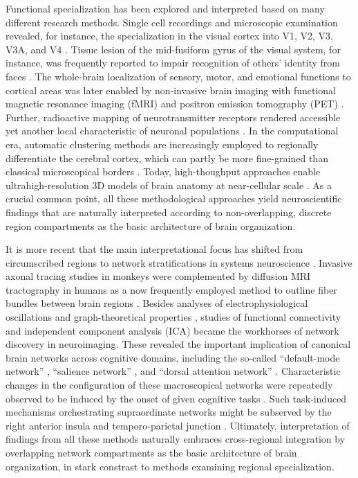 \documentclass{article} %
\begin{document}
Functional specialization has been
explored and interpreted based on many different research methods.
%
Single cell recordings and microscopic examination
revealed, for instance, the
specialization in the visual cortex into V1, V2, V3, V3A, and V4
\cite{hubel1962receptive, zeki1978functional}.
Tissue lesion of the mid-fusiform gyrus of the visual system,
for instance,
was frequently reported to impair
recognition of others' identity from faces
\cite{iaria2008contrib}.
The whole-brain localization of
sensory, motor, and emotional functions to cortical areas
was later enabled by
non-invasive brain imaging with
functional magnetic resonance imaging (fMRI) and
positron emission tomography (PET)
\cite{fristen1997imaging}.
Further,
radioactive mapping of neurotransmitter receptors
rendered accessible yet another
local characteristic of neuronal populations
\cite{zilles2009receptor}.
In the computational era,
automatic clustering methods are increasingly employed to
regionally differentiate the cerebral cortex,
which can partly be more fine-grained than
classical microscopical borders
\cite{behrens03, cbp2015review}.
Today,
high-thoughput approaches enable
ultrahigh-resolution 3D models of brain anatomy
at near-cellular scale
\cite{amunts2013bigbrain}.
%
As a crucial common point,
all these methodological approaches
yield neuroscientific findings
that are naturally interpreted according to
non-overlapping, discrete region compartments
as the basic architecture of brain organization.



It is more recent
that the main interpretational focus has shifted
from circumscribed regions to network stratifications
in systems neuroscience \cite{yuste2015, stephan_dys}.
%
Invasive axonal tracing studies in monkeys were complemented
by diffusion MRI tractography in humans
as a now frequently employed method to
outline fiber bundles between brain regions
\cite{jbabdi2013long}.
Besides analyses of
electrophysiological oscillations
\cite{buzsaki2004neuronal}
and
graph-theoretical properties \cite{bullmore2009complex},
studies of
functional connectivity \cite{buckner2013opportunities} and
independent component analysis (ICA) \cite{beckmann2005}
became the workhorses of network discovery
in neuroimaging.
These revealed the important implication of
canonical brain networks across cognitive domains,
including the so-called
``default-mode network'' \cite{raichle2001pnas},
``salience network'' \cite{seeley2007dissociable},
and ``dorsal attention network'' \cite{corbettashul2008}. 
Characteristic changes in the configuration of
these macroscopical networks
were repeatedly observed to be induced
by the onset of given cognitive tasks \cite{fransson2006}.
Such task-induced mechanisms orchestrating supraordinate networks
might be subserved by the right anterior insula \cite{sridh2008}
and temporo-parietal junction \cite{bzdok2013tpj}.
%
Ultimately,
interpretation of findings from all these methods naturally embraces
cross-regional integration by
overlapping network compartments
as the basic architecture of brain organization,
in stark constrast to methods examining regional specialization.
\end{document}
